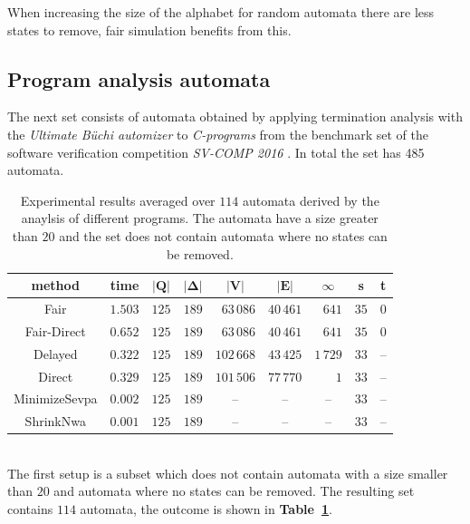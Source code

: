 \documentclass[12pt,oneside,bibliography=totoc,abstracton]{scrartcl}
\newcommand{\emptyccell}{\multicolumn{1}{c}{--}}
\newcommand{\emptyccellrightended}{\multicolumn{1}{c|}{--}}
\newcommand{\tableref}[1]{\textbf{Table~\ref{#1}}}
\newcommand{\libref}[1]{\textbf{\cite{#1}}}
\begin{document}
When increasing the size of the alphabet for random automata there are less states to remove,
fair simulation benefits from this.

\subsection{Program analysis automata}
The next set consists of automata obtained by applying termination
analysis with the \textit{Ultimate Büchi automizer} \libref{buchiautomizer} to \textit{C-programs}
from the benchmark set of the software verification competition \textit{SV-COMP 2016} \libref{svcomp16}.
In total the set has 485 automata.\\
\begin{table}[h]
	 \begin{center}
		\begin{tabular}{|c|lrrrrrrr|}
			\hline
			\multicolumn{1}{|c|}{\cellcolor{black!30}\textbf{method}}
			&\multicolumn{1}{c}{\cellcolor{black!30}\textbf{time}}
			&\multicolumn{1}{c}{\cellcolor{black!30}$\bm{|Q|}$}
			&\multicolumn{1}{c}{\cellcolor{black!30}$\bm{|\Delta|}$}
			&\multicolumn{1}{c}{\cellcolor{black!30}$\bm{|V|}$}
			&\multicolumn{1}{c}{\cellcolor{black!30}$\bm{|E|}$}
			&\multicolumn{1}{c}{\cellcolor{black!30}$\bm{\infty}$}
			&\multicolumn{1}{c}{\cellcolor{black!30}\textbf{s}}
			&\multicolumn{1}{c|}{\cellcolor{black!30}\textbf{t}}\\
			\hline
			Fair			&$1.503$	&$125$	&$189$	&$63\,086$	&$40\,461$	&$641$	&$35$	&$0$\\
			Fair-Direct		&$0.652$	&$125$	&$189$	&$63\,086$	&$40\,461$	&$641$	&$35$	&$0$\\
			Delayed		&$0.322$	&$125$	&$189$	&$102\,668$	&$43\,425$	&$1\,729$	&$33$	&\emptyccellrightended\\
			Direct			&$0.329$	&$125$	&$189$	&$101\,506$	&$77\,770$	&$1$		&$33$	&\emptyccellrightended\\
			MinimizeSevpa	&$0.002$	&$125$	&$189$	&\emptyccell	&\emptyccell	&\emptyccell	&$33$	&\emptyccellrightended\\
			ShrinkNwa		&$0.001$	&$125$	&$189$	&\emptyccell	&\emptyccell	&\emptyccell	&$33$	&\emptyccellrightended\\
			\hline
		\end{tabular}
	\end{center}
	\caption{Experimental results averaged over $114$ automata derived by the anaylsis of different programs.
		The automata have a size greater than $20$ and the set does not contain automata where no states can be removed.}
	\label{fullautomatanontrivial}
\end{table}\quad\\
The first setup is a subset which does not contain automata with a size smaller than $20$ and automata
where no states can be removed. The resulting set contains $114$ automata,
the outcome is shown in \tableref{fullautomatanontrivial}.
\end{document}
